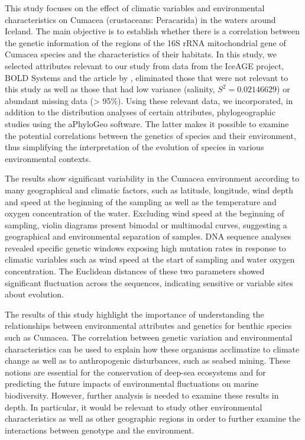 This study focuses on the effect of climatic variables and environmental characteristics on Cumacea (crustaceans: Peracarida) in the waters around Iceland. The main objective is to establish whether there is a correlation between the genetic information of the regions of the 16S rRNA mitochondrial gene of Cumacea species and the characteristics of their habitats. In this study, we selected attributes relevant to our study from data from the IceAGE project, BOLD Systems and the article by \cite{uhlir_adding_2021}, eliminated those that were not relevant to this study as well as those that had low variance (salinity, $S^2 = 0.02146629$) or abundant missing data (> 95\%). Using these relevant data, we incorporated, in addition to the distribution analyses of certain attributes, phylogeographic studies using the aPhyloGeo software. The latter makes it possible to examine the potential correlations between the genetics of species and their environment, thus simplifying the interpretation of the evolution of species in various environmental contexts.

The results show significant variability in the Cumacea environment according to many geographical and climatic factors, such as latitude, longitude, wind depth and speed at the beginning of the sampling as well as the temperature and oxygen concentration of the water. Excluding wind speed at the beginning of sampling, violin diagrams present bimodal or multimodal curves, suggesting a geographical and environmental separation of samples. DNA sequence analyses revealed specific genetic windows exposing high mutation rates in response to climatic variables such as wind speed at the start of sampling and water oxygen concentration. The Euclidean distances of these two parameters showed significant fluctuation across the sequences, indicating sensitive or variable sites about evolution.

The results of this study highlight the importance of understanding the relationships between environmental attributes and genetics for benthic species such as Cumacea. The correlation between genetic variation and environmental characteristics can be used to explain how these organisms acclimatize to climate change as well as to anthropogenic disturbances, such as seabed mining. These notions are essential for the conservation of deep-sea ecosystems and for predicting the future impacts of environmental fluctuations on marine biodiversity. However, further analysis is needed to examine these results in depth. In particular, it would be relevant to study other environmental characteristics as well as other geographic regions in order to further examine the interactions between genotype and the environment.
